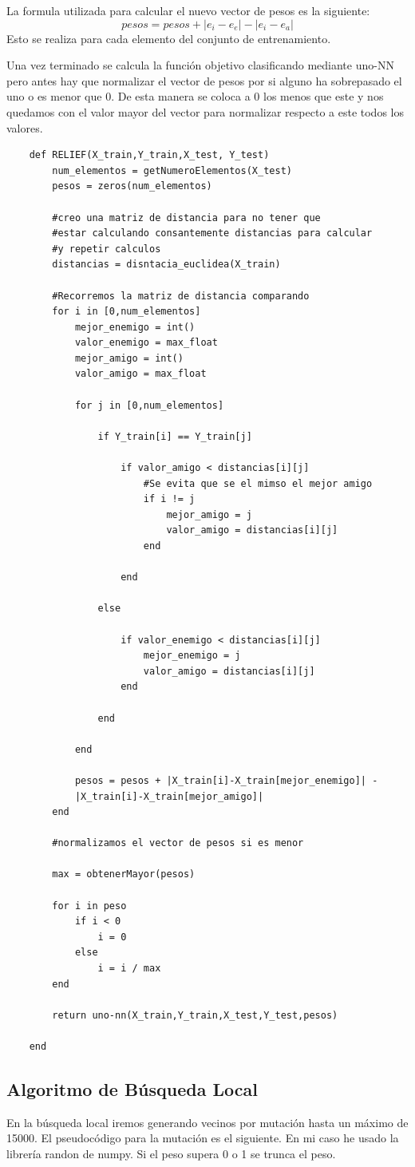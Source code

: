 \documentclass[titlepage]{article}
\begin{document}
	La formula utilizada para calcular el nuevo vector de pesos es la siguiente:
	$$
		pesos = pesos + | e_i-e_e | - |e_i - e_a|
	$$
	Esto se realiza para cada elemento del conjunto de entrenamiento. 
	
	Una vez terminado se calcula la función objetivo clasificando mediante uno-NN pero antes hay que normalizar el vector de pesos por si alguno ha sobrepasado el uno o es menor que 0. De esta manera se coloca a 0 los menos que este y nos quedamos con el valor mayor del vector para normalizar respecto a este todos los valores. 
	\newpage
	\begin{lstlisting}
	def RELIEF(X_train,Y_train,X_test, Y_test)
		num_elementos = getNumeroElementos(X_test)
		pesos = zeros(num_elementos)
		
		#creo una matriz de distancia para no tener que 
		#estar calculando consantemente distancias para calcular 
		#y repetir calculos
		distancias = disntacia_euclidea(X_train)
		
		#Recorremos la matriz de distancia comparando
		for i in [0,num_elementos]
			mejor_enemigo = int()
			valor_enemigo = max_float
			mejor_amigo = int()
			valor_amigo = max_float
			
			for j in [0,num_elementos]
			
				if Y_train[i] == Y_train[j]
					
					if valor_amigo < distancias[i][j]
						#Se evita que se el mimso el mejor amigo
						if i != j
							mejor_amigo = j
							valor_amigo = distancias[i][j]
						end
						
					end
					
				else
				
					if valor_enemigo < distancias[i][j]
						mejor_enemigo = j
						valor_amigo = distancias[i][j]
					end
					
				end	
				
			end
			
			pesos = pesos + |X_train[i]-X_train[mejor_enemigo]| -
			|X_train[i]-X_train[mejor_amigo]|
		end
		
		#normalizamos el vector de pesos si es menor 
		
		max = obtenerMayor(pesos)
		
		for i in peso
			if i < 0
				i = 0
			else
				i = i / max
		end
		
		return uno-nn(X_train,Y_train,X_test,Y_test,pesos)
		
	end	
	\end{lstlisting}
	\newpage
	\subsection{Algoritmo de Búsqueda Local}
	En la búsqueda local iremos generando vecinos por mutación hasta un máximo de 15000.
	El pseudocódigo para la mutación es el siguiente. En mi caso he usado la librería randon de numpy. Si el peso supera 0 o 1 se trunca el peso.
	
\end{document}
